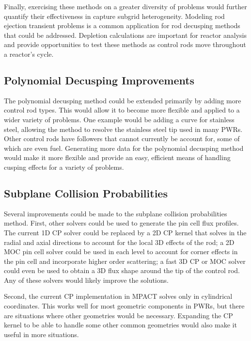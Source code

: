 Finally, exercising these methods on a greater diversity of problems would further quantify their effectiveness in capture subgrid heterogeneity.  Modeling rod ejection transient problems is a common application for rod decusping methods that could be addressed.  Depletion calculations are important for reactor analysis and provide opportunities to test these methods as control rods move throughout a reactor's cycle.

\subsection{Polynomial Decusping Improvements}

The polynomial decusping method could be extended primarily by adding more control rod types.  This would allow it to become more flexible and applied to a wider variety of problems.  One example would be adding a curve for stainless steel, allowing the method to resolve the stainless steel tip used in many PWRs.  Other control rods have followers that cannot currently be account for, some of which are even fuel.  Generating more data for the polynomial decusping method would make it more flexible and provide an easy, efficient means of handling cusping effects for a variety of problems.


\subsection{Subplane Collision Probabilities}

Several improvements could be made to the subplane collision probabilities method.  First, other solvers could be used to generate the pin cell flux profiles.  The current 1D CP solver could be replaced by a 2D CP kernel that solves in the radial and axial directions to account for the local 3D effects of the rod; a 2D MOC pin cell solver could be used in each level to account for corner effects in the pin cell and incorporate higher order scattering; a fast 3D CP or MOC solver could even be used to obtain a 3D flux shape around the tip of the control rod.  Any of these solvers would likely improve the solutions.

Second, the current CP implementation in MPACT solves only in cylindrical coordinates.  This works well for most geometric components in PWRs, but there are situations where other geometries would be necessary.  Expanding the CP kernel to be able to handle some other common geometries would also make it useful in more situations.

